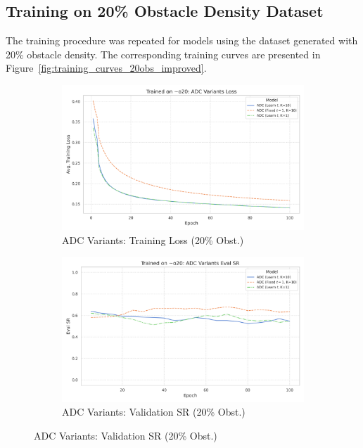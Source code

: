\subsection{Training on 20\% Obstacle Density Dataset}
\label{subsec:training_20obs}
The training procedure was repeated for models using the dataset generated with 20\% obstacle density. The corresponding training curves are presented in Figure~\ref{fig:training_curves_20obs_improved}.

\begin{figure}[htbp]
    \centering
    \begin{subfigure}[b]{0.48\textwidth}
        \centering
        \includegraphics[width=\textwidth]{trainplotbase/TRAINED_ON_20_OBS/training_curves_focused/condition_o20/adc_variants_train_loss.png} %
        \caption{ADC Variants: Training Loss (20\% Obst.)}
        \label{fig:adc_train_loss_20obs}
    \end{subfigure}
    \hfill
    \begin{subfigure}[b]{0.48\textwidth}
        \centering
        \includegraphics[width=\textwidth]{trainplotbase/TRAINED_ON_20_OBS/training_curves_focused/condition_o20/adc_variants_eval_sr.png} %
        \caption{ADC Variants: Validation SR (20\% Obst.)}
        \label{fig:adc_val_sr_20obs}
    \end{subfigure}


\end{figure}
